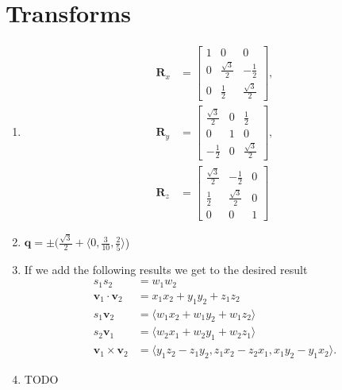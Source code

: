 \documentclass[a4paper]{report}
\begin{document}
\chapter{Transforms}
\begin{enumerate}
	\item
		\begin{align*}
			\mathbf{R}_x &=
			\left[ \begin{matrix}
				1 & 0 & 0\\
				0 & \frac{\sqrt 3}{2} & -\frac{1}{2}\\
				0 & \frac{1}{2} & \frac{\sqrt 3}{2}
			\end{matrix} \right],\\
			\mathbf{R}_y &=
			\left[ \begin{matrix}
				\frac{\sqrt 3}{2} & 0 & \frac{1}{2}\\
				0 & 1 & 0\\
				-\frac{1}{2} & 0 & \frac{\sqrt 3}{2}
			\end{matrix} \right],\\
			\mathbf{R}_z &=
			\left[ \begin{matrix}
				\frac{\sqrt 3}{2} & -\frac{1}{2} & 0\\
				\frac{1}{2} & \frac{\sqrt 3}{2} & 0\\
				0 & 0 & 1
			\end{matrix} \right]
		\end{align*}
	\item $\mathbf{q} = \pm (\frac{\sqrt 3}{2} + \langle 0, \frac{3}{10}, \frac{2}{5} \rangle$)
	\item If we add the following results we get to the desired result
		\begin{align*}
			s_1s_2 &= w_1w_2\\
			\mathbf{v}_1 \cdot \mathbf{v}_2 &= x_1x_2 + y_1y_2 + z_1z_2\\
			s_1\mathbf{v}_2 &= \langle w_1x_2 + w_1y_2 + w_1z_2 \rangle\\
			s_2\mathbf{v}_1 &= \langle w_2x_1 + w_2y_1 + w_2z_1 \rangle\\
			\mathbf{v}_1 \times \mathbf{v}_2 &= \langle y_1z_2 - z_1y_2, z_1x_2 - z_2x_1, x_1y_2 - y_1x_2 \rangle.
		\end{align*}
	\item TODO
\end{enumerate}
\end{document}
